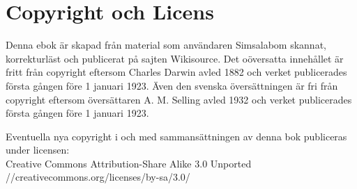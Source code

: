 \documentclass[a5paper]{book}
\begin{document}

\pagecolor{white}
\pagestyle{empty}

\pagestyle{empty}

\tableofcontents
















\appendix
\chapter{Copyright och Licens}
Denna ebok är skapad från material som användaren Simsalabom skannat, korrekturläst och publicerat på sajten 
Wikisource. Det oöversatta innehållet är fritt från copyright eftersom Charles Darwin avled 1882 och verket publicerades första gången före 1 januari 1923. Även den svenska översättningen är fri från copyright eftersom översättaren A. M. Selling avled 1932 och verket publicerades första gången före 1 januari 1923.

Eventuella nya copyright i och med sammansättningen av denna bok publiceras under licensen: \\[0.5cm]
Creative Commons Attribution-Share Alike 3.0 Unported \\
//creativecommons.org/licenses/by-sa/3.0/
\end{document}
